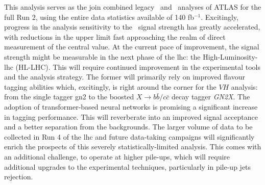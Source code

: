 This analysis serves as the join combined legacy \vhb\ and \vhc\ analyses of ATLAS for the full Run 2, using the entire data statistics available of 140 fb$^{-1}$. Excitingly, progress in the analysis sensitivity to the \vhc\ signal strength has greatly accelerated, with reductions in the upper limit fast approaching the realm of direct measurement of the central value. At the current pace of improvement, the signal strength might be measurable in the next phase of the \gls{lhc}: the High-Luminosity-\gls{lhc} (HL-LHC). This will require continued improvement in the experimental tools and the analysis strategy. The former will primarily rely on improved flavour tagging abilities which, excitingly, is right around the corner for the $VH$ analysis: from the single tagger \gls{gn2} to the boosted $X \rightarrow b\bar{b} / c\bar{c}$ decay tagger \textit{GN2X}. The adoption of transformer-based neural networks is promising a significant increase in tagging performance. This will reverberate into an improved signal acceptance and a better separation from the backgrounds. The larger volume of data to be collected in Run 4 of the \gls{lhc} and future data-taking campaigns will significantly enrich the prospects of this severely statistically-limited analysis. This comes with an additional challenge, to operate at higher pile-ups, which will require additional upgrades to the experimental techniques, particularly in pile-up jets rejection. 